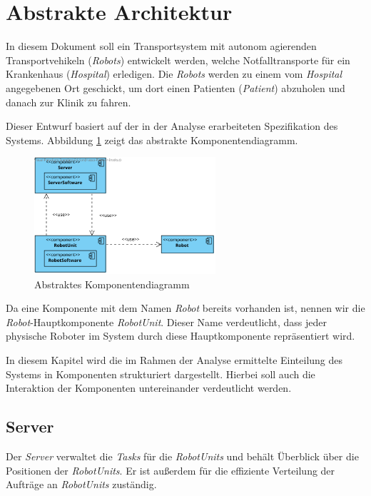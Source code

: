 \section{Abstrakte Architektur}
In diesem Dokument soll ein Transportsystem mit autonom agierenden Transportvehikeln (\emph{Robots}) entwickelt werden, welche Notfalltransporte für ein Krankenhaus (\emph{Hospital}) erledigen. 
Die \emph{Robots} werden zu einem vom \emph{Hospital} angegebenen Ort geschickt, um dort einen Patienten (\emph{Patient}) abzuholen und danach zur Klinik zu fahren.

Dieser Entwurf basiert auf der in der Analyse erarbeiteten Spezifikation des Systems. Abbildung \ref{KomponentendiagrammAbstrakt} zeigt das abstrakte Komponentendiagramm.

\begin{figure}[H]
	\centering
	\includegraphics[width=0.6\textwidth]{img/AbstrakteArchitektur}
	\caption{Abstraktes Komponentendiagramm}
	\label{KomponentendiagrammAbstrakt}
\end{figure}

Da eine Komponente mit dem Namen \emph{Robot} bereits vorhanden ist, nennen wir die \emph{Robot}-Hauptkomponente \emph{RobotUnit}. 
Dieser Name verdeutlicht, dass jeder physische Roboter im System durch diese Hauptkomponente repr\"{a}sentiert wird.


In diesem Kapitel wird die im Rahmen der Analyse ermittelte Einteilung des Systems in Komponenten strukturiert dargestellt. 
Hierbei soll auch die Interaktion der Komponenten untereinander verdeutlicht werden.

\subsection{Server}

Der \emph{Server} verwaltet die \emph{Tasks} f\"{u}r die \emph{RobotUnits} und beh\"{a}lt \"{U}berblick \"{u}ber die Positionen der \emph{RobotUnits}. 
Er ist außerdem f\"{u}r die effiziente Verteilung der Auftr\"{a}ge an \emph{RobotUnits} zust\"{a}ndig.

